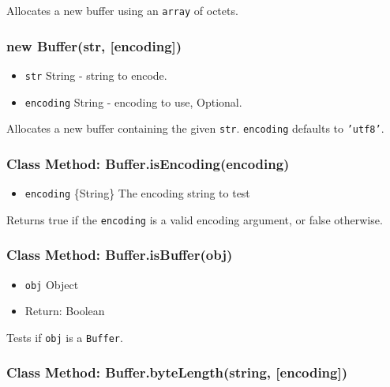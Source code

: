 Allocates a new buffer using an \texttt{array} of octets.

\subsubsection{new Buffer(str,
{[}encoding{]})}\label{new-bufferstr-encoding}

\begin{itemize}
\itemsep1pt\parskip0pt
\item
  \texttt{str} String - string to encode.
\item
  \texttt{encoding} String - encoding to use, Optional.
\end{itemize}

Allocates a new buffer containing the given \texttt{str}.
\texttt{encoding} defaults to \texttt{'utf8'}.

\subsubsection{Class Method:
Buffer.isEncoding(encoding)}\label{class-method-buffer.isencodingencoding}

\begin{itemize}
\itemsep1pt\parskip0pt
\item
  \texttt{encoding} \{String\} The encoding string to test
\end{itemize}

Returns true if the \texttt{encoding} is a valid encoding argument, or
false otherwise.

\subsubsection{Class Method:
Buffer.isBuffer(obj)}\label{class-method-buffer.isbufferobj}

\begin{itemize}
\itemsep1pt\parskip0pt
\item
  \texttt{obj} Object
\item
  Return: Boolean
\end{itemize}

Tests if \texttt{obj} is a \texttt{Buffer}.

\subsubsection{Class Method: Buffer.byteLength(string,
{[}encoding{]})}\label{class-method-buffer.bytelengthstring-encoding}


